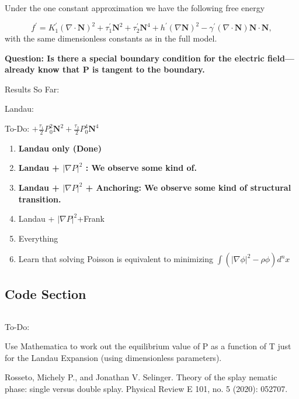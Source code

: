 \documentclass[oneside,english]{amsart}
\numberwithin{equation}{section}
\numberwithin{figure}{section}
\begin{document}
Under the one constant approximation we have the following free energy

\[
f^{\prime}=K_{1}^{\prime}\left(\nabla\cdot\mathbf{N}\right)^{2}+\tau_{1}^{\prime}\mathbf{N}^{2}+\tau_{2}^{\prime}\mathbf{N}^{4}+h^{\prime}\left(\nabla\mathbf{N}\right)^{2}-\gamma^{\prime}\left(\nabla\cdot\mathbf{N}\right)\mathbf{N}\cdot\mathbf{N},
\]
with the same dimensionless constants as in the full model.

\textbf{Question: Is there a special boundary condition for the electric
field---already know that P is tangent to the boundary.}

Results So Far:

Landau:

To-Do: $+\frac{\tau_{1}}{2}P_{0}^{2}\mathbf{N}^{2}+\frac{\tau_{2}}{2}P_{0}^{4}\mathbf{N}^{4}$
\begin{enumerate}
\item \textbf{Landau only (Done)}
\item \textbf{Landau + $|\nabla P|^{2}$ : We observe some kind of.}
\item \textbf{Landau + $|\nabla P|^{2}$ + Anchoring: We observe some kind
of structural transition.}
\item Landau + $|\nabla P|^{2}$+Frank
\item Everything
\item Learn that solving Poisson is equivalent to minimizing $\int\left(\left|\nabla\phi\right|^{2}-\rho\phi\right)d^{n}x$
\end{enumerate}

\subsection{Code Section}


\begin{lstlisting}
\end{lstlisting}

To-Do:

Use Mathematica to work out the equilibrium value of P as a function
of T just for the Landau Expansion (using dimensionless parameters).
\begin{thebibliography}{1}
Rosseto, Michely P., and Jonathan V. Selinger. \textquotedbl Theory
of the splay nematic phase: single versus double splay.\textquotedbl{}
Physical Review E 101, no. 5 (2020): 052707.

\end{thebibliography}
\end{document}
